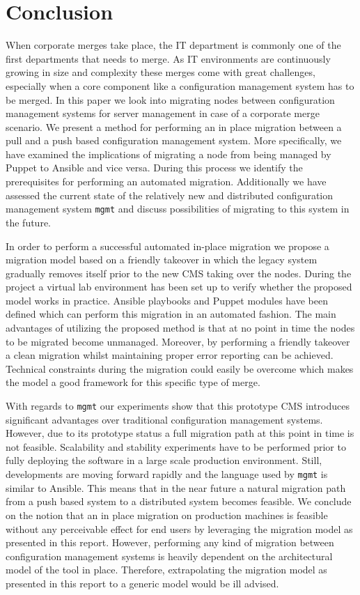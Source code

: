 \section{Conclusion}\label{sec:conclusion}
When corporate merges take place, the IT department is commonly one of the first departments that needs to merge. As IT environments are continuously growing in size and complexity these merges come with great challenges, especially when a core component like a configuration management system has to be merged. In this paper we look into migrating nodes between configuration management systems for server management in case of a corporate merge scenario. We present a method for performing an in place migration between a pull and a push based configuration management system. More specifically, we have examined the implications of migrating a node from being managed by Puppet to Ansible and vice versa. During this process we identify the prerequisites for performing an automated migration. Additionally we have assessed the current state of the relatively new and distributed configuration management system \texttt{mgmt} and discuss possibilities of migrating to this system in the future.

In order to perform a successful automated in-place migration we propose a migration model based on a friendly takeover in which the legacy system gradually removes itself prior to the new CMS taking over the nodes. During the project a virtual lab environment has been set up to verify whether the proposed model works in practice. Ansible playbooks and Puppet modules have been defined which can perform this migration in an automated fashion. The main advantages of utilizing the proposed method is that at no point in time the nodes to be migrated become unmanaged. Moreover, by performing a friendly takeover a clean migration whilst maintaining proper error reporting can be achieved. Technical constraints during the migration could easily be overcome which makes the model a good framework for this specific type of merge. 

With regards to \texttt{mgmt} our experiments show that this prototype CMS introduces significant advantages over traditional configuration management systems. However, due to its prototype status a full migration path at this point in time is not feasible. Scalability and stability experiments have to be performed prior to fully deploying the software in a large scale production environment. Still, developments are moving forward rapidly and the language used by \texttt{mgmt} is similar to Ansible. This means that in the near future a natural migration path from a push based system to a distributed system becomes feasible. We conclude on the notion that an in place migration on production machines is feasible without any perceivable effect for end users by leveraging the migration model as presented in this report. However, performing any kind of migration between configuration management systems is heavily dependent on the architectural model of the tool in place. Therefore, extrapolating the migration model as presented in this report to a generic model would be ill advised. 


